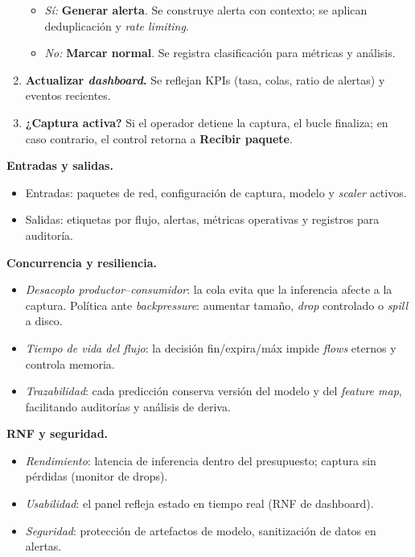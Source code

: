 \begin{enumerate}
  \begin{itemize}
    \item \emph{Sí:} \textbf{Generar alerta}. Se construye alerta con contexto; se aplican deduplicación y \emph{rate limiting}.
    \item \emph{No:} \textbf{Marcar normal}. Se registra clasificación para métricas y análisis.
  \end{itemize}
  \item \textbf{Actualizar \emph{dashboard}.} Se reflejan KPIs (tasa, colas, ratio de alertas) y eventos recientes.
  \item \textbf{¿Captura activa?} Si el operador detiene la captura, el bucle finaliza; en caso contrario, el control retorna a \textbf{Recibir paquete}.
\end{enumerate}

\textbf{Entradas y salidas.}
\begin{itemize}
  \item Entradas: paquetes de red, configuración de captura, modelo y \emph{scaler} activos.
  \item Salidas: etiquetas por flujo, alertas, métricas operativas y registros para auditoría.
\end{itemize}

\textbf{Concurrencia y resiliencia.}
\begin{itemize}
  \item \emph{Desacoplo productor–consumidor}: la cola evita que la inferencia afecte a la captura. Política ante \emph{backpressure}: aumentar tamaño, \emph{drop} controlado o \emph{spill} a disco.
  \item \emph{Tiempo de vida del flujo}: la decisión fin/expira/máx impide \emph{flows} eternos y controla memoria.
  \item \emph{Trazabilidad}: cada predicción conserva versión del modelo y del \emph{feature map}, facilitando auditorías y análisis de deriva.
\end{itemize}

\textbf{RNF y seguridad.}
\begin{itemize}
  \item \emph{Rendimiento}: latencia de inferencia dentro del presupuesto; captura sin pérdidas (monitor de drops).
  \item \emph{Usabilidad}: el panel refleja estado en tiempo real (RNF de dashboard).
  \item \emph{Seguridad}: protección de artefactos de modelo, sanitización de datos en alertas.
\end{itemize}

